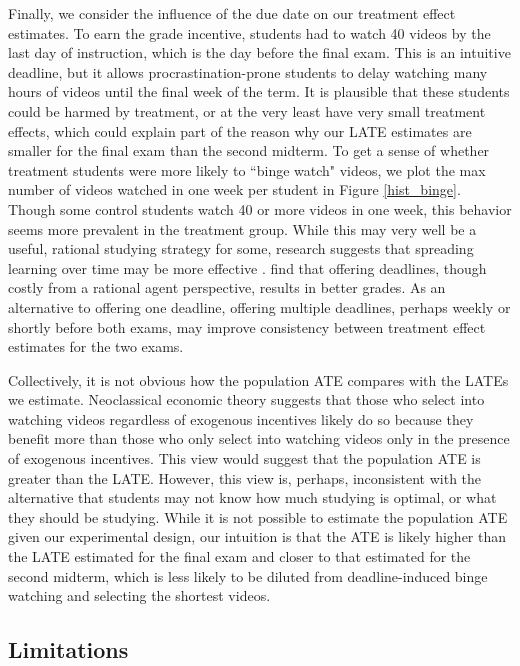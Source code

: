 \documentclass[12pt]{article}
\begin{document}
Finally, we consider the influence of the due date on our treatment effect estimates. To earn the grade incentive, students had to watch 40 videos by the last day of instruction, which is the day before the final exam. This is an intuitive deadline, but it allows procrastination-prone students to delay watching many hours of videos until the final week of the term. It is plausible that these students could be harmed by treatment, or at the very least have very small treatment effects, which could explain part of the reason why our LATE estimates are smaller for the final exam than the second midterm. To get a sense of whether treatment students were more likely to ``binge watch" videos, we plot the max number of videos watched in one week per student in Figure \ref{hist_binge}. Though some control students watch 40 or more videos in one week, this behavior seems more prevalent in the treatment group. While this may very well be a useful, rational studying strategy for some, research suggests that spreading learning over time may be more effective \parencite{kornell2009}. \textcite{aw2002} find that offering deadlines, though costly from a rational agent perspective, results in better grades. As an alternative to offering one deadline, offering multiple deadlines, perhaps weekly or shortly before both exams, may improve consistency between treatment effect estimates for the two exams.

Collectively, it is not obvious how the population ATE compares with the LATEs we estimate. Neoclassical economic theory suggests that those who select into watching videos regardless of exogenous incentives likely do so because they benefit more than those who only select into watching videos only in the presence of exogenous incentives. This view would suggest that the population ATE is greater than the LATE. However, this view is, perhaps, inconsistent with the alternative that students may not know how much studying is optimal, or what they should be studying. While it is not possible to estimate the population ATE given our experimental design, our intuition is that the ATE is likely higher than the LATE estimated for the final exam and closer to that estimated for the second midterm, which is less likely to be diluted from deadline-induced binge watching and selecting the shortest videos.

\subsection{Limitations}
\end{document}
